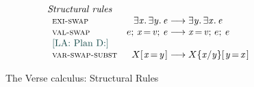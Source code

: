   \begin{figure}
    $$
    \begin{array}{l}
      \textit{Structural rules} \\
      \begin{array}{lr@{\;}c@{\;}ll}
      \rulename{exi-swap} & \ensuremath{\exists\Varid{x}.\,\exists\Varid{y}.\,\Varid{e}} & \movesto & \ensuremath{\exists\Varid{y}.\,\exists\Varid{x}.\,\Varid{e}} \\
      \rulename{val-swap} & \ensuremath{e;\,\Varid{x}\hspace{-0.14em}=\hspace{-0.14em}\Varid{v};\,\Varid{e}} & \movesto & \ensuremath{\Varid{x}\hspace{-0.14em}=\hspace{-0.14em}\Varid{v};\,e;\,\Varid{e}} \\
      \text{\lennart{Plan D:}}\\
      \rulename{var-swap-subst} & \ensuremath{X [\mskip1.5mu \Varid{x}\hspace{-0.14em}=\hspace{-0.14em}\Varid{y}\mskip1.5mu]} & \movesto & \ensuremath{X\{\Varid{x}/\Varid{y}\} [\mskip1.5mu \Varid{y}\hspace{-0.14em}=\hspace{-0.14em}\Varid{x}\mskip1.5mu]} \\
      \end{array} \\

     \end{array}
     $$
    \caption{The Verse calculus: Structural Rules}
      \label{fig:rules-structural}  \label{fig:structural}
   \end{figure}

